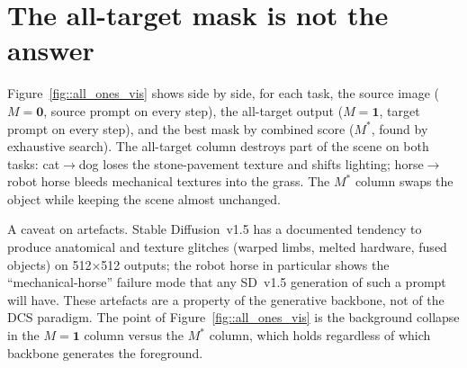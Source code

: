 \section{The all-target mask is not the answer}

Figure~\ref{fig::all_ones_vis} shows side by side, for each task, the source image ($M=\mathbf{0}$, source prompt on every step), the all-target output ($M=\mathbf{1}$, target prompt on every step), and the best mask by combined score ($M^*$, found by exhaustive search). The all-target column destroys part of the scene on both tasks: cat$\to$dog loses the stone-pavement texture and shifts lighting; horse$\to$robot horse bleeds mechanical textures into the grass. The $M^*$ column swaps the object while keeping the scene almost unchanged.

A caveat on artefacts. Stable Diffusion~v1.5 has a documented tendency to produce anatomical and texture glitches (warped limbs, melted hardware, fused objects) on 512$\times$512 outputs; the robot horse in particular shows the ``mechanical-horse'' failure mode that any SD~v1.5 generation of such a prompt will have. These artefacts are a property of the generative backbone, not of the DCS paradigm. The point of Figure~\ref{fig::all_ones_vis} is the background collapse in the $M=\mathbf{1}$ column versus the $M^*$ column, which holds regardless of which backbone generates the foreground.

